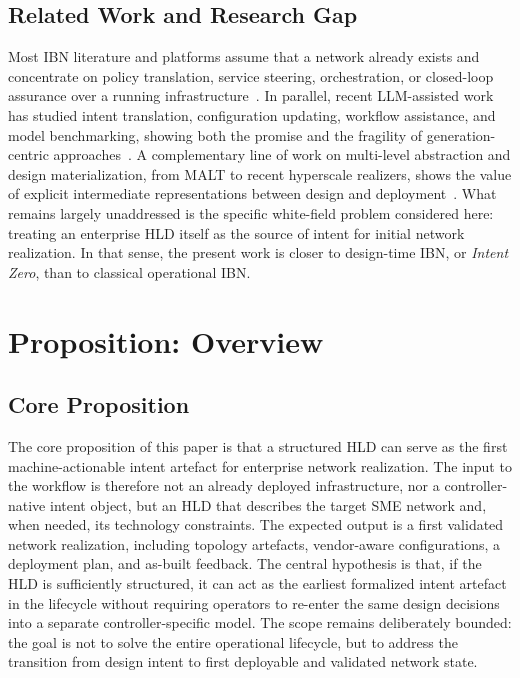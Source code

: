 \documentclass[conference]{IEEEtran}
\begin{document}
\subsection{Related Work and Research Gap}

Most IBN literature and platforms assume that a network already exists and concentrate on policy translation, service steering, orchestration, or closed-loop assurance over a running infrastructure~\cite{rfc9315,paul2025swift}. In parallel, recent LLM-assisted work has studied intent translation, configuration updating, workflow assistance, and model benchmarking, showing both the promise and the fragility of generation-centric approaches~\cite{wang2024netconfeval,han2025networkcopilot,wang2025intentdrivennetwork,mondal2025tackling}. A complementary line of work on multi-level abstraction and design materialization, from MALT to recent hyperscale realizers, shows the value of explicit intermediate representations between design and deployment~\cite{jeffreyMALT20,cai2026matryoshka}. What remains largely unaddressed is the specific white-field problem considered here: treating an enterprise HLD itself as the source of intent for initial network realization. In that sense, the present work is closer to design-time IBN, or \emph{Intent Zero}, than to classical operational IBN.

\section{Proposition: Overview}


\subsection{Core Proposition}

The core proposition of this paper is that a structured HLD can serve as the first machine-actionable intent artefact for enterprise network realization. The input to the workflow is therefore not an already deployed infrastructure, nor a controller-native intent object, but an HLD that describes the target SME network and, when needed, its technology constraints. The expected output is a first validated network realization, including topology artefacts, vendor-aware configurations, a deployment plan, and as-built feedback. The central hypothesis is that, if the HLD is sufficiently structured, it can act as the earliest formalized intent artefact in the lifecycle without requiring operators to re-enter the same design decisions into a separate controller-specific model. The scope remains deliberately bounded: the goal is not to solve the entire operational lifecycle, but to address the transition from design intent to first deployable and validated network state.
\end{document}
